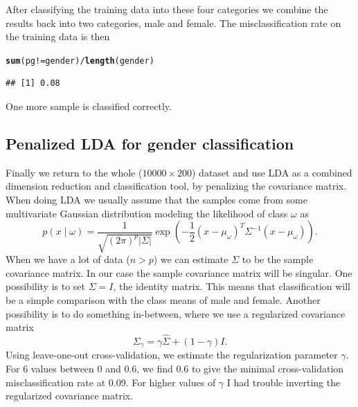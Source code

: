 \documentclass[a4paper]{article}\usepackage[]{graphicx}\usepackage[]{color}
\makeatletter
\newcommand{\hlopt}[1]{\textcolor[rgb]{0,0,0}{#1}}%
\newcommand{\hlstd}[1]{\textcolor[rgb]{0.345,0.345,0.345}{#1}}%
\newcommand{\hlkwd}[1]{\textcolor[rgb]{0.737,0.353,0.396}{\textbf{#1}}}%
\newenvironment{kframe}{%
 \def\at@end@of@kframe{}%
 \ifinner\ifhmode%
  \def\at@end@of@kframe{\end{minipage}}%
  \begin{minipage}{\columnwidth}%
 \fi\fi%
 \def\FrameCommand##1{\hskip\@totalleftmargin \hskip-\fboxsep
 \colorbox{shadecolor}{##1}\hskip-\fboxsep
     \hskip-\linewidth \hskip-\@totalleftmargin \hskip\columnwidth}%
 \MakeFramed {\advance\hsize-\width
   \@totalleftmargin\z@ \linewidth\hsize
   \@setminipage}}%
 {\par\unskip\endMakeFramed%
 \at@end@of@kframe}
\newenvironment{knitrout}{}{} %
\makeatother
\begin{document}
After classifying the training data into these four categories we combine the results back into two categories, male and female. The misclassification rate on the training data is then
\begin{knitrout}
\color{fgcolor}\begin{kframe}
\begin{alltt}
\hlkwd{sum}\hlstd{(pg} \hlopt{!=} \hlstd{gender)} \hlopt{/} \hlkwd{length}\hlstd{(gender)}
\end{alltt}
\begin{verbatim}
## [1] 0.08
\end{verbatim}
\end{kframe}
\end{knitrout}
One more sample is classified correctly.

\subsection{Penalized LDA for gender classification}





Finally we return to the whole ($10000 \times 200$) dataset and use LDA as a combined dimension reduction and classification tool, by penalizing the covariance matrix. When doing LDA we usually assume that the samples come from some multivariate Gaussian distribution modeling the likelihood of class $\omega$ as
\begin{equation}
p(x \mid \omega) = \frac{1}{\sqrt{(2\pi)^p |\Sigma|}} \exp \left( -\frac{1}{2} (x - \mu_\omega)^T \Sigma^{-1} (x - \mu_\omega) \right).
\end{equation}
When we have a lot of data ($n > p$) we can estimate $\Sigma$ to be the sample covariance matrix. In our case the sample covariance matrix will be singular. One possibility is to set $\Sigma = I$, the identity matrix. This means that classification will be a simple comparison with the class means of male and female. Another possibility is to do something in-between, where we use a regularized covariance matrix
\begin{equation}
\Sigma_\gamma = \gamma \hat{\Sigma} + (1-\gamma) I.
\end{equation}
Using leave-one-out cross-validation, we estimate the regularization parameter $\gamma$. For 6 values between 0 and 0.6, we find 0.6 to give the minimal cross-validation misclassification rate at 0.09. For higher values of $\gamma$ I had trouble inverting the regularized covariance matrix.
\end{document}

